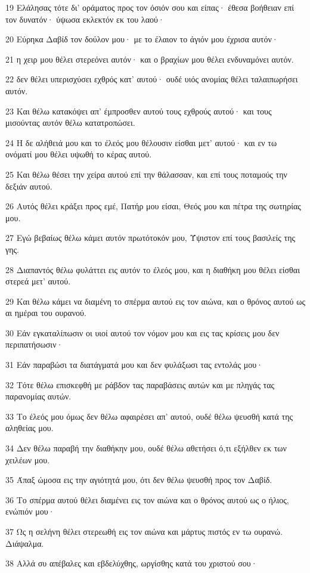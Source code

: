 \par 19 Ελάλησας τότε δι' οράματος προς τον όσιόν σου και είπας· έθεσα βοήθειαν επί τον δυνατόν· ύψωσα εκλεκτόν εκ του λαού·
\par 20 Εύρηκα Δαβίδ τον δούλον μου· με το έλαιον το άγιόν μου έχρισα αυτόν·
\par 21 η χειρ μου θέλει στερεόνει αυτόν· και ο βραχίων μου θέλει ενδυναμόνει αυτόν.
\par 22 δεν θέλει υπερισχύσει εχθρός κατ' αυτού· ουδέ υιός ανομίας θέλει ταλαιπωρήσει αυτόν.
\par 23 Και θέλω κατακόψει απ' έμπροσθεν αυτού τους εχθρούς αυτού· και τους μισούντας αυτόν θέλω κατατροπώσει.
\par 24 Η δε αλήθειά μου και το έλεός μου θέλουσιν είσθαι μετ' αυτού· και εν τω ονόματί μου θέλει υψωθή το κέρας αυτού.
\par 25 Και θέλω θέσει την χείρα αυτού επί την θάλασσαν, και επί τους ποταμούς την δεξιάν αυτού.
\par 26 Αυτός θέλει κράξει προς εμέ, Πατήρ μου είσαι, Θεός μου και πέτρα της σωτηρίας μου.
\par 27 Εγώ βεβαίως θέλω κάμει αυτόν πρωτότοκόν μου, Ύψιστον επί τους βασιλείς της γης.
\par 28 Διαπαντός θέλω φυλάττει εις αυτόν το έλεός μου, και η διαθήκη μου θέλει είσθαι στερεά μετ' αυτού.
\par 29 Και θέλω κάμει να διαμένη το σπέρμα αυτού εις τον αιώνα, και ο θρόνος αυτού ως αι ημέραι του ουρανού.
\par 30 Εάν εγκαταλίπωσιν οι υιοί αυτού τον νόμον μου και εις τας κρίσεις μου δεν περιπατήσωσιν·
\par 31 Εάν παραβώσι τα διατάγματά μου και δεν φυλάξωσι τας εντολάς μου·
\par 32 Τότε θέλω επισκεφθή με ράβδον τας παραβάσεις αυτών και με πληγάς τας παρανομίας αυτών.
\par 33 Το έλεός μου όμως δεν θέλω αφαιρέσει απ' αυτού, ουδέ θέλω ψευσθή κατά της αληθείας μου.
\par 34 Δεν θέλω παραβή την διαθήκην μου, ουδέ θέλω αθετήσει ό,τι εξήλθεν εκ των χειλέων μου.
\par 35 Άπαξ ώμοσα εις την αγιότητά μου, ότι δεν θέλω ψευσθή προς τον Δαβίδ.
\par 36 Το σπέρμα αυτού θέλει διαμένει εις τον αιώνα και ο θρόνος αυτού ως ο ήλιος, ενώπιόν μου·
\par 37 Ως η σελήνη θέλει στερεωθή εις τον αιώνα και μάρτυς πιστός εν τω ουρανώ. Διάψαλμα.
\par 38 Αλλά συ απέβαλες και εβδελύχθης, ωργίσθης κατά του χριστού σου·
